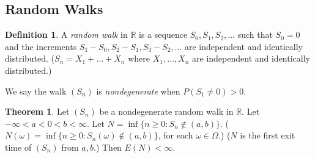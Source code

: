 \documentclass{article}
\newcommand{\R}{\mathbb{R}}
\theoremstyle{definition}
\newtheorem{theorem}{Theorem}
\newtheorem*{definition}{Definition}
\begin{document}
\subsection*{Random Walks}

\begin{definition}
A \emph{random walk} in $\R$ is a sequence $S_0, S_1, S_2, \dots$ such that $S_0 = 0$ and the increments $S_1 - S_0, S_2 - S_1, S_3 - S_2, \dots$ are independent and identically distributed. ($S_n = X_1 + \dots + X_n$ where $X_1, \dots, X_n$ are independent and identically distributed.)

We say the walk $(S_n)$ is \emph{nondegenerate} when $P(S_1 \neq 0) > 0$.
\end{definition}

\begin{theorem}
    Let $(S_n)$ be a nondegenerate random walk in $\R$. Let $-\infty < a < 0 < b < \infty$. Let $N = \inf\{n \geq 0 : S_n \notin (a,b)\}$. ($N(\omega) = \inf\{n \geq 0 : S_n(\omega) \notin (a,b)\}$, for each $\omega \in \Omega$.) ($N$ is the first exit time of $(S_n)$ from $a, b$.) Then $E(N) < \infty$.
\end{theorem}
\end{document}

